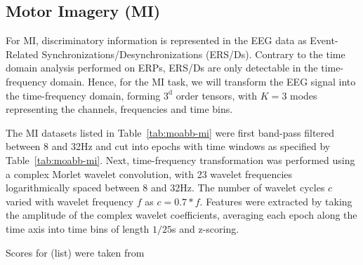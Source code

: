 \documentclass[twocolumn]{article}
\begin{document}
\subsection{Motor Imagery (MI)}
For MI, discriminatory information is represented in the EEG data as
Event-Related Synchronizations/Desynchronizations (ERS/Ds).
Contrary to the time domain analysis performed on ERPs, ERS/Ds are only
detectable in the time-frequency domain.
Hence, for the MI task, we will transform the EEG signal into the
time-frequency domain, forming $3^\text{d}$ order tensors, with $K=3$ modes
representing the channels, frequencies and time bins.

The MI datasets listed in Table~\ref{tab:moabb-mi} were first band-pass filtered between 8 and 32Hz and cut into
epochs with time windows as specified by Table~\ref{tab:moabb-mi}.
Next, time-frequency transformation was performed using a complex Morlet wavelet
convolution, with 23 wavelet frequencies logarithmically spaced between 8 and
32Hz.
The number of wavelet cycles $c$ varied with wavelet frequency $f$ as
$c=0.7*f$.
Features were extracted by taking the amplitude of the complex wavelet
coefficients, averaging each epoch along the time axis into time bins of
length $1/25$s and z-scoring.
\begin{table*}[t]
  \footnotesize
  
  \caption{Scores for (list) were taken from \cite{Chevallier2024}}
  \label{tab:mi-score}
\end{table*}
\end{document}
